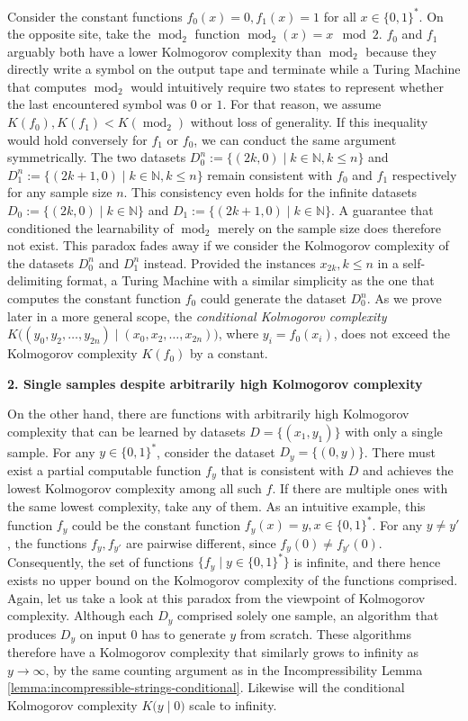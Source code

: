 Consider the constant functions $f_0(x)=0,f_1(x)=1$ for all $x\in\{0,1\}^{*}$.
On the opposite site, take the $\operatorname{mod}_2$ function $\operatorname{mod}_2(x)=x\mod 2$.
$f_0$ and $f_1$ arguably both have a lower Kolmogorov complexity than $\operatorname{mod}_2$ because they directly write a symbol on the output tape and terminate while a Turing Machine that computes $\operatorname{mod}_2$ would intuitively require two states to represent whether the last encountered symbol was $0$ or $1$.
For that reason, we assume $K(f_0),K(f_1)<K(\operatorname{mod}_2)$ without loss of generality.
If this inequality would hold conversely for $f_1$ or $f_0$, we can conduct the same argument symmetrically.
The two datasets $D_0^{n}:=\{(2k,0)\mid k\in\mathbb{N},k\leq n\}$ and $D_1^{n}:=\{(2k+1,0)\mid k\in\mathbb{N},k\leq n\}$ remain consistent with $f_0$ and $f_1$ respectively for any sample size $n$.
This consistency even holds for the infinite datasets $D_0:=\{(2k,0)\mid k\in\mathbb{N}\}$ and $D_1:=\{(2k+1,0)\mid k\in\mathbb{N}\}$.
A guarantee that conditioned the learnability of $\operatorname{mod}_2$ merely on the sample size does therefore not exist.
This paradox fades away if we consider the Kolmogorov complexity of the datasets $D_0^{n}$ and $D_1^{n}$ instead.
Provided the instances $x_{2k},k\leq n$ in a self-delimiting format, a Turing Machine with a similar simplicity as the one that computes the constant function $f_0$ could generate the dataset $D_0^{n}$.
As we prove later in a more general scope, the \textit{conditional Kolmogorov complexity} $K\bigl((y_0,y_2,\dots,y_{2n}) \mid (x_0,x_2,\dots,x_{2n})\bigr)$, where $y_i=f_0(x_i)$, does not exceed the Kolmogorov complexity $K(f_0)$ by a constant.

\textbf{2. Single samples despite arbitrarily high Kolmogorov complexity}

On the other hand, there are functions with arbitrarily high Kolmogorov complexity that can be learned by datasets $D=\{(x_1,y_1)\}$ with only a single sample.
For any $y\in\{0,1\}^{*}$, consider the dataset $D_y=\{(0,y)\}$.
There must exist a partial computable function $f_y$ that is consistent with $D$ and achieves the lowest Kolmogorov complexity among all such $f$.
If there are multiple ones with the same lowest complexity, take any of them.
As an intuitive example, this function $f_y$ could be the constant function $f_y(x)=y, x\in\{0,1\}^{*}$.
For any $y\neq y'$, the functions $f_{y},f_{y'}$ are pairwise different, since $f_{y}(0)\neq f_{y'}(0)$.
Consequently, the set of functions $\{f_y\mid y\in\{0,1\}^{*}\}$ is infinite, and there hence exists no upper bound on the Kolmogorov complexity of the functions comprised.
Again, let us take a look at this paradox from the viewpoint of Kolmogorov complexity.
Although each $D_y$ comprised solely one sample, an algorithm that produces $D_y$ on input $0$ has to generate $y$ from scratch. 
These algorithms therefore have a Kolmogorov complexity that similarly grows to infinity as $y\to\infty$, by the same counting argument as in the Incompressibility Lemma \ref{lemma:incompressible-strings-conditional}.
Likewise will the conditional Kolmogorov complexity $K\bigl(y \mid 0\bigr)$ scale to infinity. 

